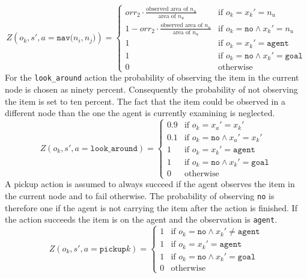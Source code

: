\begin{equation}\label{eq:Onav}
    Z(o_k, s', a=\texttt{nav($n_i, n_j$)}) = 
    \begin{cases}
        orr_2 \cdot \frac{\text{observed area of }n_u}{\text{area of }n_u} & \text{if }o_k=x_k'=n_u \\
        1 - orr_2 \cdot \frac{\text{observed area of }n_u}{\text{area of }n_u} & \text{if } o_k=\texttt{no}\land x_k'=n_u\\
        1 & \text{if }o_k=x_k'=\texttt{agent}\\
        1 & \text{if }o_k=\texttt{no}\land x_k'=\texttt{goal}\\
        0 & \text{otherwise}
    \end{cases}
\end{equation}
For the \texttt{look\_around} action the probability of observing the item in the current node is chosen as ninety percent. Consequently the probability of not observing the item is set to ten percent. The fact that the item could be observed in a different node than the one the agent is currently examining is neglected. 
\begin{equation}\label{eq:lookaround}
    Z(o_k, s', a=\texttt{look\_around}) = \begin{cases}
    0.9& \text{if } o_k=x_a'=x_k'\\
    0.1 &\text{if } o_k=\texttt{no} \land x_a'=x_k'\\
    1& \text{if }o_k=x_k'=\texttt{agent}\\
    1& \text{if }o_k=\texttt{no}\land x_k'=\texttt{goal}
    \\0 &\text{otherwise} \end{cases}
\end{equation}
A pickup action is assumed to always succeed if the agent observes the item in the current node and to fail otherwise. The probability of observing \texttt{no} is therefore one if the agent is not carrying the item after the action is finished. If the action succeeds the item is on the agent and the observation is \texttt{agent}.
\begin{equation}\label{eq:pickup}
    Z(o_k, s', a=\texttt{pickup}k) = \begin{cases}
    1 &\text{if } o_k=\texttt{no} \land x_k'\neq \texttt{agent}\\
    1& \text{if }o_k=x_k'=\texttt{agent}\\
    1& \text{if }o_k=\texttt{no}\land x_k'=\texttt{goal}
    \\0 &\text{otherwise} \end{cases}
\end{equation}
